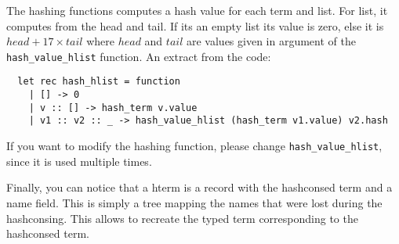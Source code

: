The hashing functions computes a hash value for each term and list. For list, it
computes from the head and tail. If its an empty list its value is zero, else it
is $head + 17 \times tail$ where $head$ and $tail$ are values given in
argument of the \texttt{hash\_value\_hlist} function. An extract from the code:
\begin{verbatim}
  let rec hash_hlist = function
    | [] -> 0
    | v :: [] -> hash_term v.value
    | v1 :: v2 :: _ -> hash_value_hlist (hash_term v1.value) v2.hash
\end{verbatim}
If you want to modify the hashing function, please change
\texttt{hash\_value\_hlist}, since it is used multiple times.

Finally, you can notice that a hterm is a record with the hashconsed term and a
name field. This is simply a tree mapping the names that were lost during the
hashconsing. This allows to recreate the typed term corresponding to the
hashconsed term.
